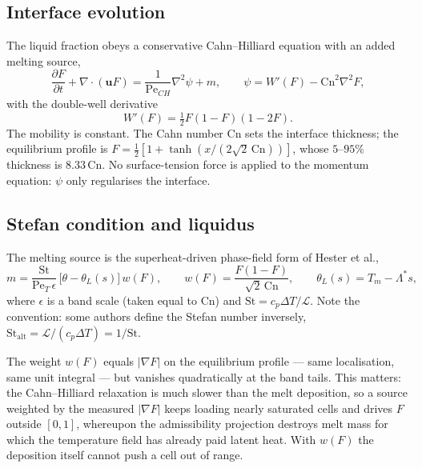 \documentclass[review,12pt]{elsarticle}
\newcommand{\uvec}{\mathbf{u}}
\newcommand{\Pet}{\mathrm{Pe}_T}
\newcommand{\Pech}{\mathrm{Pe}_{CH}}
\newcommand{\St}{\mathrm{St}}
\begin{document}
\subsection{Interface evolution}

The liquid fraction obeys a conservative Cahn--Hilliard equation with an added
melting source,
\begin{equation}
  \frac{\partial F}{\partial t} + \nabla\cdot(\uvec F)
  = \frac{1}{\Pech}\nabla^2\psi + m ,
  \qquad
  \psi = W'(F) - \mathrm{Cn}^2\nabla^2 F ,
  \label{eq:ch}
\end{equation}
with the double-well derivative
\begin{equation}
  W'(F) = \tfrac12 F(1-F)(1-2F) .
  \label{eq:doublewell}
\end{equation}
The mobility is constant. The Cahn number $\mathrm{Cn}$ sets the interface
thickness; the equilibrium profile is
$F = \tfrac12\left[1+\tanh\!\left(x/(2\sqrt{2}\,\mathrm{Cn})\right)\right]$,
whose $5$--$95\%$ thickness is $8.33\,\mathrm{Cn}$. No surface-tension force is
applied to the momentum equation: $\psi$ only regularises the interface.

\subsection{Stefan condition and liquidus}

The melting source is the superheat-driven phase-field form of Hester et al.,
\begin{equation}
  m = \frac{\St}{\Pet\,\epsilon}\,
      \bigl[\theta - \theta_L(s)\bigr]\, w(F),
  \qquad
  w(F) = \frac{F(1-F)}{\sqrt{2}\,\mathrm{Cn}},
  \qquad
  \theta_L(s) = T_m - \Lambda^{*} s ,
  \label{eq:melt}
\end{equation}
where $\epsilon$ is a band scale (taken equal to $\mathrm{Cn}$) and
$\St = c_p\Delta T/\mathcal{L}$. Note the convention: some authors define the
Stefan number inversely, $\St_{\mathrm{alt}} = \mathcal{L}/(c_p\Delta T) = 1/\St$.

The weight $w(F)$ equals $|\nabla F|$ on the equilibrium profile --- same
localisation, same unit integral --- but vanishes quadratically at the band
tails. This matters: the Cahn--Hilliard relaxation is much slower than the melt
deposition, so a source weighted by the measured $|\nabla F|$ keeps loading
nearly saturated cells and drives $F$ outside $[0,1]$, whereupon the
admissibility projection destroys melt mass for which the temperature field has
already paid latent heat. With $w(F)$ the deposition itself cannot push a cell
out of range.
\end{document}
